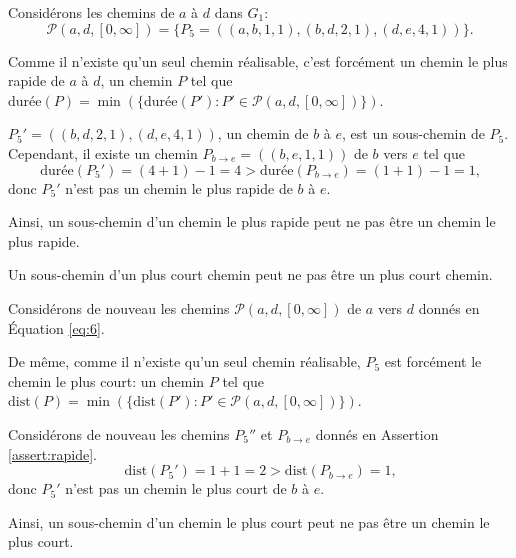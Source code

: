 \begin{reponse}
  Considérons les chemins de $a$ à $d$ dans $G_{1}$:
  \begin{equation}
    \mathcal{P}(a,d,[0, \infty]) = \{P_5 = ((a,b,1,1),(b,d,2,1),(d,e,4,1))\} \text{.}
    \label{eq:6}
  \end{equation}

  Comme il n'existe qu'un seul chemin réalisable, c'est forcément un chemin le
  plus rapide de $a$ à $d$, un chemin $P$ tel que
  $\mathrm{durée}(P) = \min(\{\mathrm{durée}(P'): P' \in \mathcal{P}(a,d,[0,
  \infty]) \})$.

  $P_{5}' = ((b,d,2,1),(d,e,4,1))$, un chemin de $b$ à $e$, est un sous-chemin
  de $P_5$. Cependant, il existe un chemin $P_{b \rightarrow e} = ((b,e,1,1))$
  de $b$ vers $e$ tel que
  \begin{equation}
    \mathrm{durée}(P_{5}') = (4+1) - 1 = 4 > \mathrm{durée}(P_{b \rightarrow e}) = (1+1) - 1 = 1 \text{,}
    \label{eq:3}
  \end{equation}
  donc $P_{5}'$ n'est pas un chemin le plus rapide de $b$ à $e$.

  Ainsi, un sous-chemin d'un chemin le plus rapide peut ne pas être un chemin le
  plus rapide.
\end{reponse}

\begin{assertion}
  Un sous-chemin d'un plus court chemin peut ne pas être un plus court chemin.
\end{assertion}

\begin{reponse}
  Considérons de nouveau les chemins $\mathcal{P}(a,d,[0, \infty])$ de $a$ vers
  $d$ donnés en Équation \ref{eq:6}.

  De même, comme il n'existe qu'un seul chemin réalisable, $P_5$ est forcément
  le chemin le plus court: un chemin $P$ tel que
  $\mathrm{dist}(P) = \min(\{\mathrm{dist}(P'): P' \in \mathcal{P}(a,d,[0,
  \infty]) \})$.

  Considérons de nouveau les chemins $P_{5}''$ et $P_{b \rightarrow e}$ donnés
  en Assertion \ref{assert:rapide}.
  \begin{equation}
    \mathrm{dist}(P_{5}') = 1 + 1 = 2 > \mathrm{dist}(P_{b \rightarrow e}) = 1 \text{,}
    \label{eq:3}
  \end{equation}
  donc $P_{5}'$ n'est pas un chemin le plus court de $b$ à $e$.

  Ainsi, un sous-chemin d'un chemin le plus court peut ne pas être un chemin le
  plus court.

\end{reponse}

